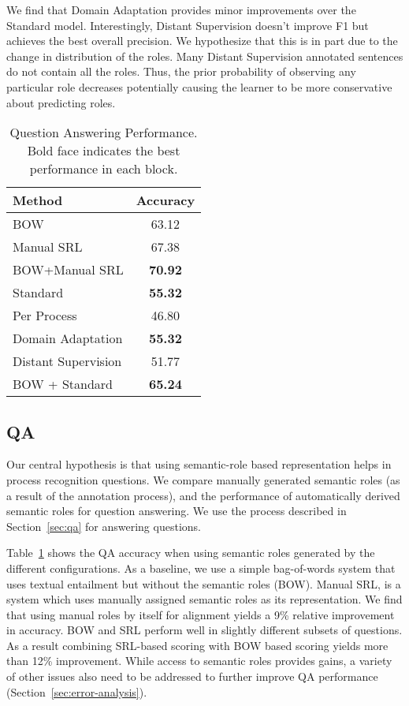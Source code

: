 We find that Domain Adaptation provides minor improvements over the Standard model. Interestingly, Distant Supervision doesn't improve F1 but achieves the best overall precision. 
We hypothesize that this is in part due to the change in distribution of the roles. 
Many Distant Supervision annotated sentences do not contain all the roles. 
Thus, the prior probability of observing any particular role decreases potentially causing the learner to be more conservative about predicting roles.  
\begin{table}[htdp]
\begin{center}
\begin{tabular}{|l|c|}
\hline
Method & Accuracy\\
\hline
BOW & 63.12\\
Manual SRL & 67.38\\
BOW+Manual SRL & {\bf 70.92}\\
\hline
Standard	& {\bf 55.32}\\
Per Process & 46.80 \\
Domain Adaptation & {\bf 55.32}\\
Distant Supervision & 51.77\\
\hline
BOW + Standard  & {\bf 65.24}\\
\hline
\end{tabular}
\caption{Question Answering Performance. Bold face indicates the best performance in each block.}
\label{tab:qa-results}
\end{center}
\vspace{-3ex}
\end{table}

\subsection{QA}
Our central hypothesis is that using semantic-role based representation helps in process recognition questions. 
We compare manually generated semantic roles (as a result of the annotation process), and the performance of automatically derived semantic roles for question answering. 
We use the process described in Section~\ref{sec:qa} for answering questions. 

Table~\ref{tab:qa-results} shows the QA accuracy when using semantic roles generated by the different configurations. 
As a baseline, we use a simple bag-of-words system that uses textual entailment but without the semantic roles (BOW). 
Manual SRL, is a system which uses manually assigned semantic roles as its representation. 
We find that using manual roles by itself for alignment yields a 9\% relative improvement in accuracy. 
BOW and SRL perform well in slightly different subsets of questions. 
As a result combining SRL-based scoring with BOW based scoring yields more than 12\% improvement. 
While access to semantic roles provides gains, a variety of other issues also need to be addressed to further improve QA performance (Section~\ref{sec:error-analysis}).

